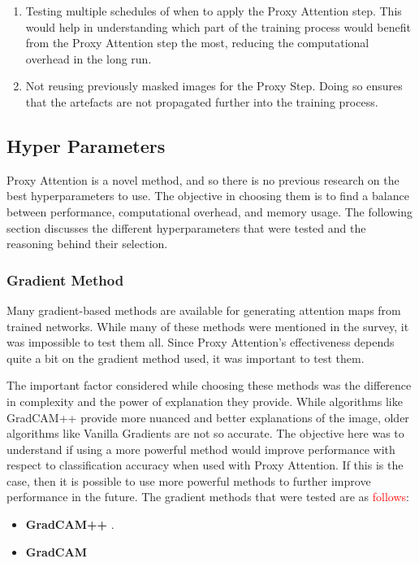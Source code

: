 \begin{enumerate}
    \item Testing multiple schedules of when to apply the Proxy Attention step. This would help in understanding which part of the training process would benefit from the Proxy Attention step the most, reducing the computational overhead in the long run.
    \item Not reusing previously masked images for the Proxy Step. Doing so ensures that the artefacts are not propagated further into the training process.
\end{enumerate}

\subsection{Hyper Parameters} \label{sec:hyperparameters}
Proxy Attention is a novel method, and so there is no previous research on the best hyperparameters to use. The objective in choosing them is to find a balance between performance, computational overhead, and memory usage. The following section discusses the different hyperparameters that were tested and the reasoning behind their selection.

\subsubsection{Gradient Method}
Many gradient-based methods are available for generating attention maps from trained networks. While many of these methods were mentioned in the survey, it was impossible to test them all. Since Proxy Attention's effectiveness depends quite a bit on the gradient method used, it was important to test them.

The important factor considered while choosing these methods was the difference in complexity and the power of explanation they provide. While algorithms like GradCAM++ \cite{chattopadhayGradCAMGeneralizedGradientBased2018} provide more nuanced and better explanations of the image, older algorithms like Vanilla Gradients \cite{zeilerVisualizingUnderstandingConvolutional2013} are not so accurate. The objective here was to understand if using a more powerful method would improve performance with respect to classification accuracy when used with Proxy Attention. If this is the case, then it is possible to use more powerful methods to further improve performance in the future.
The gradient methods that were tested are as \textcolor{red}{follows}:
\begin{itemize}
    \item \textbf{GradCAM++} \cite{chattopadhayGradCAMGeneralizedGradientBased2018}.
    \item \textbf{GradCAM} \cite{selvarajuGradCAMVisualExplanations}
\end{itemize}

